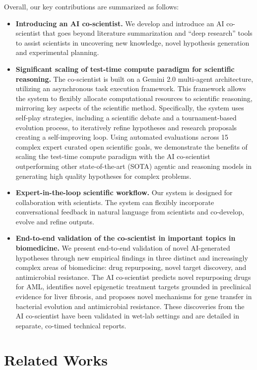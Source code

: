 Overall, our key contributions are summarized as follows:
\begin{itemize}[leftmargin=1.5em,rightmargin=0em]
    \item\textbf{Introducing an AI co-scientist.} We develop and introduce an AI co-scientist that goes beyond literature summarization and ``deep research'' tools to assist scientists in uncovering new knowledge, novel hypothesis generation and experimental planning.
    \item\textbf{Significant scaling of test-time compute paradigm for scientific reasoning.} The co-scientist is built on a Gemini 2.0 multi-agent architecture, utilizing an asynchronous task execution framework. This framework allows the system to flexibly allocate computational resources to scientific reasoning, mirroring key aspects of the scientific method. Specifically, the system uses self-play strategies, including a scientific debate and a tournament-based evolution process, to iteratively refine hypotheses and research proposals creating a self-improving loop. Using automated evaluations across 15 complex expert curated open scientific goals, we demonstrate the benefits of scaling the test-time compute paradigm with the AI co-scientist outperforming other state-of-the-art (SOTA) agentic and reasoning models in generating high quality hypotheses for complex problems.
    \item\textbf{Expert-in-the-loop scientific workflow.} Our system is designed for collaboration with scientists. The system can flexibly incorporate conversational feedback in natural language from scientists and co-develop, evolve and refine outputs.
    \item \textbf{End-to-end validation of the co-scientist in important topics in biomedicine.} We present end-to-end validation of novel AI-generated hypotheses through new empirical findings in three distinct and increasingly complex areas of biomedicine: drug repurposing, novel target discovery, and antimicrobial resistance. The AI co-scientist predicts novel repurposing drugs for AML, identifies novel epigenetic treatment targets grounded in preclinical evidence for liver fibrosis, and proposes novel mechanisms for gene transfer in bacterial evolution and antimicrobial resistance. These discoveries from the AI co-scientist have been validated in wet-lab settings and are detailed in separate, co-timed technical reports.
\end{itemize}


\section{Related Works}
